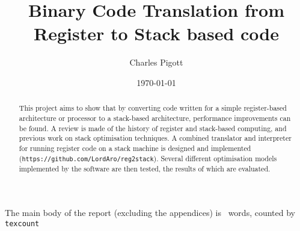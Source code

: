 \documentclass[11pt,a4paper,notitlepage]{report}
\title{Binary Code Translation from Register to Stack based code}
\author{Charles Pigott}
\date{\today}
\newcommand\wordcount{\unskip}
\begin{document}
\maketitle

\begin{abstract}
  This project aims to show that by converting code written for a simple
  register-based architecture or processor to a stack-based architecture,
  performance improvements can be found.  A review is made of the history of
  register and stack-based computing, and previous work on stack optimisation
  techniques.  A combined translator and interpreter for running register code
  on a stack machine is designed and implemented
  (\texttt{https://github.com/LordAro/reg2stack}).  Several different
  optimisation models implemented by the software are then tested, the results
  of which are evaluated.
\end{abstract}

\vfill

\small{The main body of the report (excluding the appendices) is
\wordcount~words, counted by \texttt{texcount}}

\cleardoublepage%

\normalsize
\tableofcontents








\small\printbibliography%
\clearpage

\begin{appendices}

\end{appendices}
\end{document}
